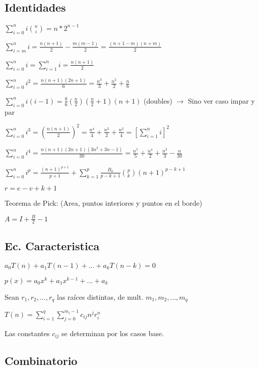 \subsection{Identidades}
{

$\sum_{i=0}^n i\binom{n}{i}=n*2^{n-1}$

$\sum_{i=m}^n i = \frac{n(n+1)}{2} - \frac{m(m-1)}{2} = \frac{(n+1-m)(n+m)}{2}$

$\sum_{i=0}^n i = \sum_{i=1}^n i = \frac{n(n+1)}{2}$

$\sum_{i=0}^n i^2 = \frac{n(n+1)(2n+1)}{6} = \frac{n^3}{3} + \frac{n^2}{2} + \frac{n}{6}$

$\sum_{i=0}^n i(i-1) = \frac{8}{6}(\frac{n}{2})(\frac{n}{2}+1)(n+1)$ (doubles) $\rightarrow$ Sino ver caso impar y par

$\sum_{i=0}^n i^3 = \left(\frac{n(n+1)}{2}\right)^2 = \frac{n^4}{4} + \frac{n^3}{2} + \frac{n^2}{4} = \left[\sum_{i=1}^n i\right]^2$

$\sum_{i=0}^n i^4 = \frac{n(n+1)(2n+1)(3n^2+3n-1)}{30} = \frac{n^5}{5} + \frac{n^4}{2} + \frac{n^3}{3} - \frac{n}{30}$

$\sum_{i=0}^n i^p = \frac{(n+1)^{p+1}}{p+1} + \sum_{k=1}^p\frac{B_k}{p-k+1}{p\choose k}(n+1)^{p-k+1}$

$r=e-v+k+1$

Teorema de Pick: (Area, puntos interiores y puntos en el borde)

$A=I+\frac{B}{2}-1$


}%
\subsection{Ec. Caracteristica}
$a_0T(n)+a_1T(n-1)+...+a_kT(n-k)=0$

$p(x)=a_0 x^k + a_1 x^{k-1} + ... + a_k$

Sean $r_1,r_2,...,r_q$ las raíces distintas, de mult. $m_1, m_2, ..., m_q$

$T(n)=\sum_{i=1}^q{\sum_{j=0}^{m_i - 1}c_{ij} n^j r_i^n}$

Las constantes $c_{ij}$ se determinan por los casos base.
\subsection{Combinatorio}
